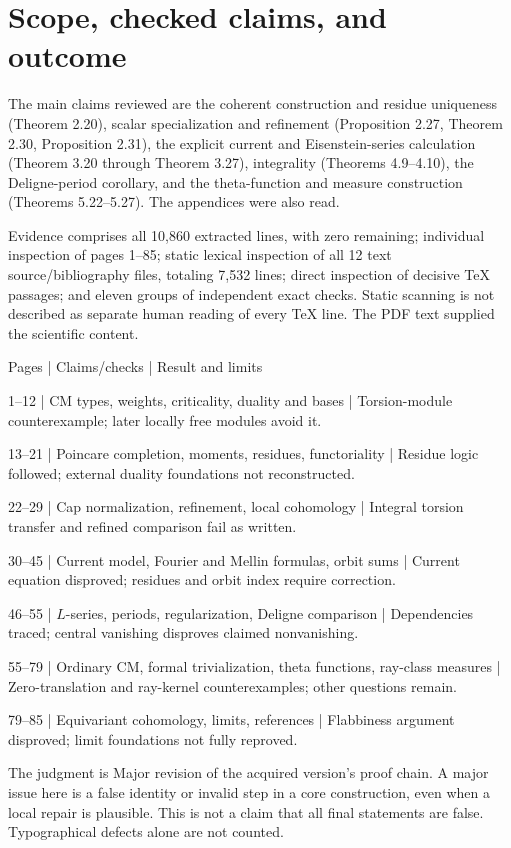 \documentclass[10pt]{article}
\begin{document}
\section*{Scope, checked claims, and outcome}
The main claims reviewed are the coherent construction and residue uniqueness (Theorem 2.20), scalar specialization and refinement (Proposition 2.27, Theorem 2.30, Proposition 2.31), the explicit current and Eisenstein-series calculation (Theorem 3.20 through Theorem 3.27), integrality (Theorems 4.9–4.10), the Deligne-period corollary, and the theta-function and measure construction (Theorems 5.22–5.27). The appendices were also read.\par
Evidence comprises all 10,860 extracted lines, with zero remaining; individual inspection of pages 1–85; static lexical inspection of all 12 text source/bibliography files, totaling 7,532 lines; direct inspection of decisive TeX passages; and eleven groups of independent exact checks. Static scanning is not described as separate human reading of every TeX line. The PDF text supplied the scientific content.\par
Pages | Claims/checks | Result and limits\par
1–12 | CM types, weights, criticality, duality and bases | Torsion-module counterexample; later locally free modules avoid it.\par
13–21 | Poincare completion, moments, residues, functoriality | Residue logic followed; external duality foundations not reconstructed.\par
22–29 | Cap normalization, refinement, local cohomology | Integral torsion transfer and refined comparison fail as written.\par
30–45 | Current model, Fourier and Mellin formulas, orbit sums | Current equation disproved; residues and orbit index require correction.\par
46–55 | \(L\)-series, periods, regularization, Deligne comparison | Dependencies traced; central vanishing disproves claimed nonvanishing.\par
55–79 | Ordinary CM, formal trivialization, theta functions, ray-class measures | Zero-translation and ray-kernel counterexamples; other questions remain.\par
79–85 | Equivariant cohomology, limits, references | Flabbiness argument disproved; limit foundations not fully reproved.\par
The judgment is Major revision of the acquired version’s proof chain. A major issue here is a false identity or invalid step in a core construction, even when a local repair is plausible. This is not a claim that all final statements are false. Typographical defects alone are not counted.\par
\end{document}
